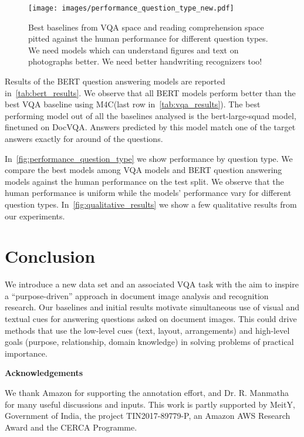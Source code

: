 \documentclass[10pt,twocolumn,letterpaper]{article}
\newcommand{\datasetName}{DocVQA\xspace}
\newcommand{\mc}{M4C\xspace}
\begin{document}
\begin{figure}[h]
    \centering
    \texttt{[image: images/performance\_question\_type\_new.pdf]}
    \caption{Best baselines from VQA space and reading comprehension space pitted against the human performance for different question types. We need models which can understand figures and text on photographs better. We need better handwriting recognizers too!}
    \label{fig:performance_question_type}
    \vspace{-4mm}

\end{figure}

Results of the BERT question answering models are  reported in~\autoref{tab:bert_results}. We observe that all BERT models perform better than the best VQA baseline using \mc (last row in~\ref{tab:vqa_results}). 
The best performing model out of all the baselines analysed is the bert-large-squad model, finetuned on \datasetName. Answers predicted by this model match one of the target answers exactly for around   of the questions.

In~\autoref{fig:performance_question_type} we show performance by question type. We compare the best models among VQA models and BERT question answering models against the human performance on the test split. We observe that the human performance is uniform while the models' performance vary for different question types.
In~\autoref{fig:qualitative_results} we show a few qualitative results from our experiments.
 
\section{Conclusion}
We introduce a new data set and an associated VQA task with the aim to inspire a ``purpose-driven'' approach in document image analysis and recognition research. Our baselines and initial results motivate simultaneous use of visual and textual cues for answering questions asked on document images. This could drive methods that use the low-level cues (text, layout, arrangements) and high-level goals (purpose, relationship, domain knowledge) in solving problems of practical importance.
\vspace{2mm}

\noindent\textbf{Acknowledgements}

We thank Amazon for supporting the annotation effort, and Dr. R. Manmatha for many useful discussions and inputs. This work is partly supported by MeitY, Government of India, the project TIN2017-89779-P, an Amazon AWS Research Award and the CERCA Programme.
\end{document}
